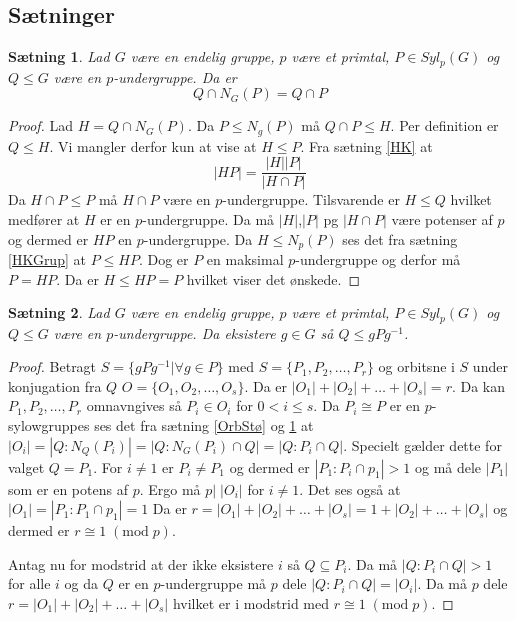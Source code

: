 \documentclass{article}
\newcommand{\inv}{^{-1}}
\newtheorem{setn}{Sætning}
\begin{document}
		\subsection*{Sætninger}
		\begin{setn} \label{SylNormCap}
			Lad $G$ være en endelig gruppe, $p$ være et primtal, $P \in Syl_p(G)$
			og $Q \le G$ være en $p$-undergruppe. Da er
			$$Q\cap N_G(P) = Q\cap P$$
		\end{setn}
		\begin{proof}
			Lad $H = Q\cap N_G(P)$.
			Da $P \le N_g(P)$ må $Q\cap P \le H$. Per definition er $Q \le H$.
			Vi mangler derfor kun at vise at $H \le P$. Fra sætning \ref{HK} at
			$$|HP| = \frac{|H||P|}{|H \cap P|}$$
			Da $H \cap P \le P$ må $H \cap P$ være en $p$-undergruppe. Tilsvarende
			er $H \le Q$ hvilket medfører at $H$ er en $p$-undergruppe.
			Da må $|H|$,$|P|$ pg $|H \cap P|$ være potenser af $p$ og dermed er
			$HP$ en $p$-undergruppe. Da $H \le N_p(P)$ ses det fra sætning \ref{HKGrup}
			at $P \le HP$. Dog er $P$ en maksimal $p$-undergruppe og derfor må
			$P = HP$. Da er $H \le HP = P$ hvilket viser det ønskede.
		\end{proof}
		\begin{setn} \label{Syl2}
			Lad $G$ være en endelig gruppe, $p$ være et primtal, $P \in Syl_p(G)$ og $Q \le G$
			være en $p$-undergruppe. Da eksistere $g \in G$ så $Q \le gPg\inv$.
		\end{setn}
		\begin{proof}
			Betragt $S = \{gPg\inv| \forall g \in P\}$ med $S = \{P_1,P_2,\dots,P_r\}$
			og orbitsne i $S$ under konjugation fra $Q$ $O = \{O_1,O_2,\dots,O_s\}$.
			Da er $|O_1|+|O_2|+\dots+|O_s| = r$. Da kan $P_1,P_2,\dots,P_r$ omnavngives
			så $P_i \in O_i$ for $0<i\le s$. Da $P_i \cong P$ er en $p$-sylowgruppes ses
			det fra sætning \ref{OrbStø} og \ref{SylNormCap} at
			$|O_i| = |Q: N_Q(P_i)| = |Q: N_G(P_i)\cap Q| = |Q:P_i\cap Q|$.
			Specielt gælder dette for valget $Q = P_1$. For $i \ne 1$ er
			$P_i \ne P_1$ og dermed er $|P_1:P_i\cap p_1| > 1$ og må dele $|P_1|$
			som er en potens af $p$. Ergo må $p \big | \; |O_i|$ for $i \ne 1$.
			Det ses også at $|O_1| = |P_1:P_1\cap p_1| = 1$
			Da er $r = |O_1|+|O_2|+\dots+|O_s| = 1 + |O_2|+\dots+|O_s|$
			og dermed er $r \cong 1 \; (\mathrm{mod}\; p)$.

			Antag nu for modstrid at der ikke eksistere $i$ så $Q \subseteq P_i$.
			Da må $|Q:P_i\cap Q| > 1$ for alle $i$ og da $Q$ er en $p$-undergruppe må
			$p$ dele $|Q:P_i\cap Q| = |O_i|$. Da må $p$ dele $r = |O_1|+|O_2|+\dots+|O_s|$
			hvilket er i modstrid med $r \cong 1 \; (\mathrm{mod}\; p)$.
		\end{proof}
\end{document}
